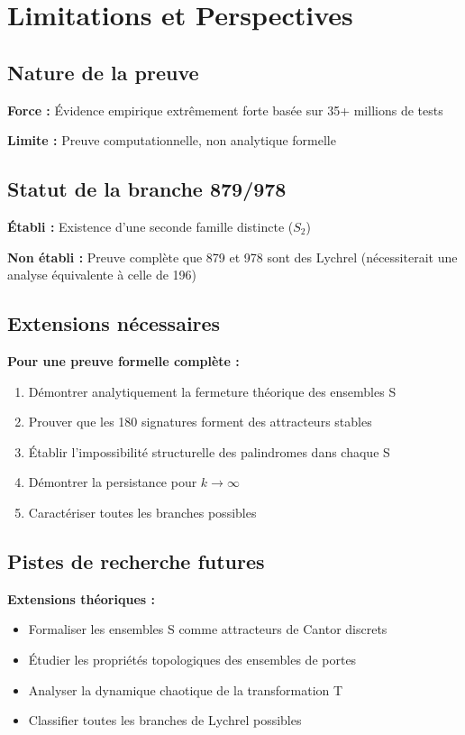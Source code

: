 \documentclass[12pt,a4paper]{article}
\theoremstyle{remark}
\begin{document}
\section{Limitations et Perspectives}
\label{sec:limitations}

\subsection{Nature de la preuve}

\textbf{Force :} Évidence empirique extrêmement forte basée sur 35+ millions de tests

\textbf{Limite :} Preuve computationnelle, non analytique formelle

\subsection{Statut de la branche 879/978}

\textbf{Établi :} Existence d'une seconde famille distincte ($S_2$)

\textbf{Non établi :} Preuve complète que 879 et 978 sont des Lychrel (nécessiterait une analyse équivalente à celle de 196)

\subsection{Extensions nécessaires}

\textbf{Pour une preuve formelle complète :}
\begin{enumerate}
\item Démontrer analytiquement la fermeture théorique des ensembles S
\item Prouver que les 180 signatures forment des attracteurs stables
\item Établir l'impossibilité structurelle des palindromes dans chaque S
\item Démontrer la persistance pour $k \to \infty$
\item Caractériser toutes les branches possibles
\end{enumerate}

\subsection{Pistes de recherche futures}

\textbf{Extensions théoriques :}
\begin{itemize}
\item Formaliser les ensembles S comme attracteurs de Cantor discrets
\item Étudier les propriétés topologiques des ensembles de portes
\item Analyser la dynamique chaotique de la transformation T
\item Classifier toutes les branches de Lychrel possibles
\end{itemize}
\end{document}
